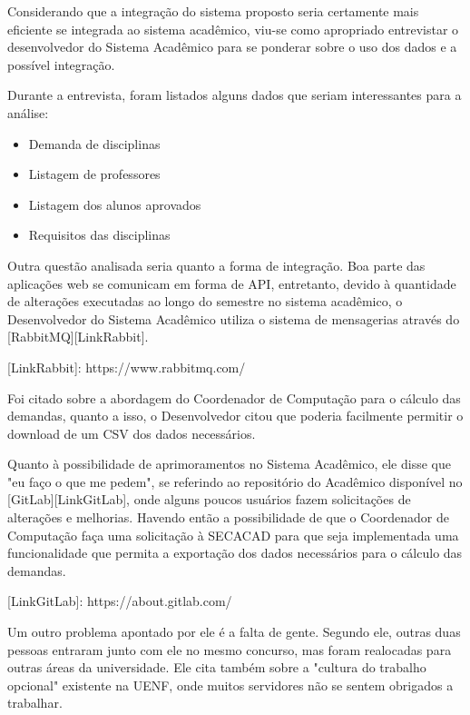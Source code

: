 Considerando que a integração do sistema proposto seria certamente mais eficiente se integrada ao sistema acadêmico, viu-se como apropriado entrevistar o desenvolvedor do Sistema Acadêmico para se ponderar sobre o uso dos dados e a possível integração.

Durante a entrevista, foram listados alguns dados que seriam interessantes para a análise:

\begin{itemize}
    \item Demanda de disciplinas
    \item Listagem de professores
    \item Listagem dos alunos aprovados
    \item Requisitos das disciplinas
\end{itemize}


Outra questão analisada seria quanto a forma de integração. Boa parte das aplicações web se comunicam em forma de API, entretanto, devido à quantidade de alterações executadas ao longo do semestre no sistema acadêmico, o Desenvolvedor do Sistema Acadêmico utiliza o sistema de mensagerias através do [RabbitMQ][LinkRabbit].

[LinkRabbit]: https://www.rabbitmq.com/

Foi citado sobre a abordagem do Coordenador de Computação para o cálculo das demandas, quanto a isso, o Desenvolvedor citou que poderia facilmente permitir o download de um CSV dos dados necessários.

Quanto à possibilidade de aprimoramentos no Sistema Acadêmico, ele disse que "eu faço o que me pedem", se referindo ao repositório do Acadêmico disponível no [GitLab][LinkGitLab], onde alguns poucos usuários fazem solicitações de alterações e melhorias. Havendo então a possibilidade de que o Coordenador de Computação faça uma solicitação à SECACAD para que seja implementada uma funcionalidade que permita a exportação dos dados necessários para o cálculo das demandas.

[LinkGitLab]: https://about.gitlab.com/

Um outro problema apontado por ele é a falta de gente. Segundo ele, outras duas pessoas entraram junto com ele no mesmo concurso, mas foram realocadas para outras áreas da universidade. Ele cita também sobre a "cultura do trabalho opcional" existente na UENF, onde muitos servidores não se sentem obrigados a trabalhar.

